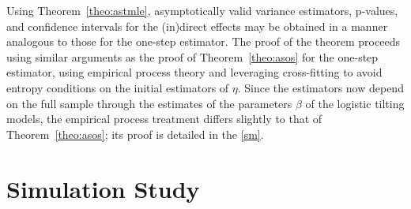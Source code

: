 Using Theorem~\ref{theo:astmle}, asymptotically valid variance estimators,
p-values, and confidence intervals for the (in)direct effects may be obtained in
a manner analogous to those for the one-step estimator. The proof of the theorem
proceeds using similar arguments as the proof of Theorem~\ref{theo:asos} for the
one-step estimator, using empirical process theory and leveraging cross-fitting
to avoid entropy conditions on the initial estimators of $\eta$. Since the
estimators now depend on the full sample through the estimates of the parameters
$\beta$ of the logistic tilting models, the empirical process treatment differs
slightly to that of Theorem~\ref{theo:asos}; its proof is detailed in the
\ref{sm}.

\section{Simulation Study}\label{sec:sim}

